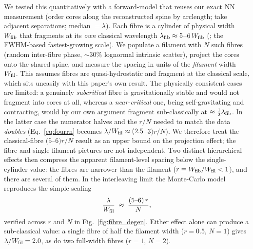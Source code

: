 \documentclass[usenatbib,twoside,twocolumn]{mnras}
\begin{document}
We tested this quantitatively with a forward-model that reuses our exact NN measurement (order cores along the reconstructed spine by arclength; take adjacent separations; median $=\lambda$). Each fibre is a cylinder of physical width $W_{\rm fib}$ that fragments at its \emph{own} classical wavelength $\lambda_{\rm fib}\approx5$--$6\,W_{\rm fib}$ (\citealt{Fischera2012}; the FWHM-based fastest-growing scale). We populate a filament with $N$ such fibres (random inter-fibre phase, $\sim30\%$ lognormal intrinsic scatter), project the cores onto the shared spine, and measure the spacing in units of the \emph{filament} width $W_{\rm fil}$. This assumes fibres are quasi-hydrostatic and fragment at the classical scale, which sits uneasily with this paper's own result. The physically consistent cases are limited: a genuinely \emph{subcritical} fibre is gravitationally stable and would not fragment into cores at all, whereas a \emph{near-critical} one, being self-gravitating and contracting, would by our own argument fragment sub-classically at $\approx\tfrac12\lambda_{\rm fib}$. In the latter case the numerator halves and the $r/N$ needed to match the data \emph{doubles} (Eq.~\ref{eq:fourrn} becomes $\lambda/W_{\rm fil}\approx(2.5$--$3)r/N$). We therefore treat the classical-fibre $(5$--$6)r/N$ result as an upper bound on the projection effect; the fibre and single-filament pictures are not independent. Two distinct hierarchical effects then compress the apparent filament-level spacing below the single-cylinder value: the fibres are narrower than the filament ($r\equiv W_{\rm fib}/W_{\rm fil}<1$), and there are several of them. In the interleaving limit the Monte-Carlo model reproduces the simple scaling
\begin{equation}
\frac{\lambda}{W_{\rm fil}} \;\approx\; \frac{(5\text{--}6)\,r}{N},
\label{eq:fourrn}
\end{equation}
verified across $r$ and $N$ in Fig.~\ref{fig:fibre_degen}. Either effect alone can produce a sub-classical value: a single fibre of half the filament width ($r=0.5$, $N=1$) gives $\lambda/W_{\rm fil}=2.0$, as do two full-width fibres ($r=1$, $N=2$).
\end{document}
